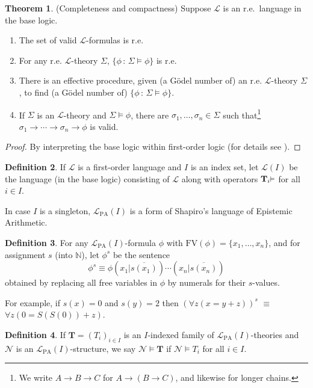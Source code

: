 \documentclass[reqno]{article}
\theoremstyle{definition}
\newtheorem{theorem}{Theorem}
\newtheorem{definition}[theorem]{Definition}
\def\N{\mathbb{N}}
\def\L{\mathscr{L}}
\def\T{\mathbf{T}}
\def\FV{\mathrm{FV}}
\def\LPA{\L_{\mathrm{PA}}}
\renewcommand{\Pr}[1]{\T_{#1}\mbox{\small${\vDash}$}}
\begin{document}
\begin{theorem}
\label{completecompact}
(Completeness and compactness)  Suppose $\L$ is an r.e.~language in the base logic.
\begin{enumerate}
\item The set of valid $\L$-formulas is r.e.
\item For any r.e. $\L$-theory $\Sigma$, $\{\phi\,:\,\Sigma\models\phi\}$ is r.e.
\item There is an effective procedure, given (a G\"odel number of) an r.e.
$\L$-theory $\Sigma$,
to find (a G\"odel number of) $\{\phi\,:\,\Sigma\models\phi\}$.
\item If $\Sigma$ is an $\L$-theory and $\Sigma\models\phi$, there
are $\sigma_1,\ldots,\sigma_n\in\Sigma$ such that\footnote{We write
$A\rightarrow B\rightarrow C$ for $A\rightarrow (B\rightarrow C)$, and likewise for longer
chains.} $\sigma_1\rightarrow\cdots\rightarrow\sigma_n\rightarrow\phi$ is valid.
\end{enumerate}
\end{theorem}

\begin{proof}
By interpreting the base logic within first-order logic (for details see \cite{alexanderdissert}).
\end{proof}

\begin{definition}
\label{selfrefdefn}
If $\L$ is a first-order language and $I$ is an index set, let $\L(I)$ be the
language (in the base logic) consisting of $\L$ along with 
operators $\Pr{i}$ for all $i\in I$.
\end{definition}


In case $I$ is a singleton, $\LPA(I)$ is a form of Shapiro's \cite{shapiro1985}
language of Epistemic Arithmetic.


\begin{definition}
\label{sentencemaker}
For any $\LPA(I)$-formula $\phi$ with $\FV(\phi)=\{x_1,\ldots,x_n\}$, and for
assignment $s$ (into $\N$), let $\phi^s$ be the sentence
\[
\phi^s \equiv \phi(x_1|\overline{s(x_1)})\cdots(x_n|\overline{s(x_n)})
\]
obtained by replacing all free variables in $\phi$ by numerals for their
$s$-values.
\end{definition}

For example, if $s(x)=0$ and $s(y)=2$ then $(\forall z(x=y+z))^s$ ${\equiv}$ $\forall z(0=S(S(0))+z)$.


\begin{definition}
If $\T=(T_i)_{i\in I}$ is an $I$-indexed family of $\LPA(I)$-theories
and $\mathscr N$ is an $\LPA(I)$-structure, we say $\mathscr N\models\T$
if $\mathscr N\models T_i$ for all $i\in I$.
\end{definition}
\end{document}
